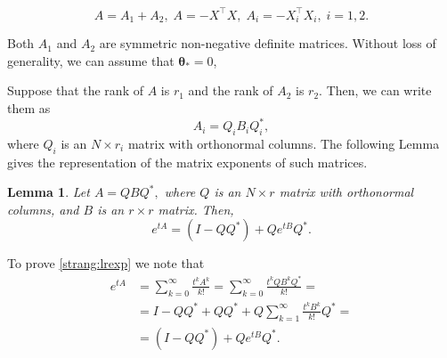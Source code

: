 \documentclass{article}
\newtheorem{lemma}{Lemma}
\newcommand{\vect}[1]{\boldsymbol{\mathbf{#1}}}
\begin{document}
\begin{equation*}
A = A_1 + A_2, \; A = -X^{\top} X, \; A_i = -X^{\top}_i X_i, \; i = 1, 2.
\end{equation*}

Both $A_1$ and $A_2$ are symmetric non-negative definite matrices. Without loss of generality, we can assume that $\vect{\theta}_* = 0$,

Suppose that the rank of $A$ is $r_1$ and the rank of $A_2$ is $r_2$. Then, we can write them as
\begin{equation*}
A_i = Q_i B_i Q^*_i,
\end{equation*}
where $Q_i$ is an $N \times r_i$ matrix with orthonormal columns.  The following Lemma gives the representation of the matrix exponents of such matrices.
\begin{lemma}\label{strang:lemexp}
Let $A = Q B Q^*,$ where $Q$ is an $N \times r$ matrix with orthonormal columns, and $B$ is an $r \times r$ matrix. Then,
\begin{equation}\label{strang:lrexp}
    e^{t A}  = (I - QQ^*) + Q e^{t B} Q^*.
\end{equation}
\end{lemma}
To prove \eqref{strang:lrexp} we note that
\begin{equation*}
\begin{split}
e^{t A} &= \sum_{k=0}^{\infty} \frac{t^k A^k}{k!} = \sum_{k=0}^{\infty} \frac{t^k Q B^k Q^*}{k!} = \\ &= I - QQ^* + QQ^* + Q \sum_{k=1}^{\infty} \frac{t^k B^k}{k!} Q^* = \\ &= (I - QQ^*) + Q e^{t B} Q^*.
\end{split}
\end{equation*}
\end{document}
